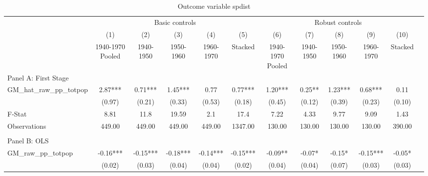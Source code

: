 \begin{table}[htbp]\centering {} \begin{threeparttable} \caption{Outcome variable spdist } \begin{tabular}{l*{11}{c}} \toprule
          &\multicolumn{5}{c}{Basic controls}                                   &\multicolumn{5}{c}{Robust controls}                                  \\\cmidrule(lr){2-6}\cmidrule(lr){7-11}
          &\multicolumn{1}{c}{(1)}&\multicolumn{1}{c}{(2)}&\multicolumn{1}{c}{(3)}&\multicolumn{1}{c}{(4)}&\multicolumn{1}{c}{(5)}&\multicolumn{1}{c}{(6)}&\multicolumn{1}{c}{(7)}&\multicolumn{1}{c}{(8)}&\multicolumn{1}{c}{(9)}&\multicolumn{1}{c}{(10)}\\
          &\multicolumn{1}{c}{1940-1970 Pooled}&\multicolumn{1}{c}{1940-1950}&\multicolumn{1}{c}{1950-1960}&\multicolumn{1}{c}{1960-1970}&\multicolumn{1}{c}{Stacked}&\multicolumn{1}{c}{1940-1970 Pooled}&\multicolumn{1}{c}{1940-1950}&\multicolumn{1}{c}{1950-1960}&\multicolumn{1}{c}{1960-1970}&\multicolumn{1}{c}{Stacked}\\
\cmidrule(lr){1-11}
\multicolumn{10}{l}{Panel A: First Stage}\\
\cmidrule(lr){1-11}
GM\_hat\_raw\_pp\_totpop&      2.87***&      0.71***&      1.45***&      0.77   &      0.77***&      1.20***&      0.25** &      1.23***&      0.68***&      0.11   \\
          &    (0.97)   &    (0.21)   &    (0.33)   &    (0.53)   &    (0.18)   &    (0.45)   &    (0.12)   &    (0.39)   &    (0.23)   &    (0.10)   \\
\midrule
F-Stat    &      8.81   &      11.8   &     19.59   &       2.1   &      17.4   &      7.22   &      4.33   &      9.77   &      9.09   &      1.43   \\
Observations&    449.00   &    449.00   &    449.00   &    449.00   &   1347.00   &    130.00   &    130.00   &    130.00   &    130.00   &    390.00   \\
\cmidrule[\heavyrulewidth](lr){1-11} \\ \cmidrule[\heavyrulewidth](lr){1-11}
\multicolumn{10}{l}{Panel B: OLS}\\
\cmidrule(lr){1-11}
GM\_raw\_pp\_totpop&     -0.16***&     -0.15***&     -0.18***&     -0.14***&     -0.15***&     -0.09** &     -0.07*  &     -0.15*  &     -0.15***&     -0.05*  \\
          &    (0.02)   &    (0.03)   &    (0.04)   &    (0.04)   &    (0.02)   &    (0.04)   &    (0.04)   &    (0.07)   &    (0.03)   &    (0.03)   \\

\end{tabular}
\end{threeparttable}
\end{table}
